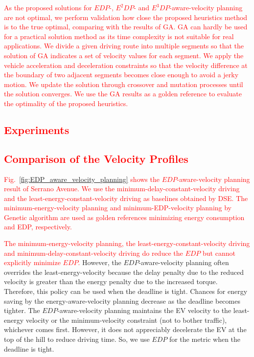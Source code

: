 \documentclass{IEEEtran}
\begin{document}
\textcolor{red}{As the proposed solutions for  $EDP$-, $E^2DP$- and $E^3DP$-aware-velocity planning are not optimal, we perform  validation how close the proposed heuristics method is to the true optimal, comparing with the results of GA. GA can hardly be used for a practical solution method as its time complexity is not suitable for real applications. %
We divide a given driving route into multiple segments so that the solution of GA indicates a set of velocity values for each segment. %
We apply the vehicle acceleration and deceleration constraints so that the velocity difference at the boundary of two adjacent segments becomes close enough to avoid a jerky motion. We update the solution through crossover and mutation processes until the solution converges. We use the GA results as a golden reference to evaluate the optimality of the proposed heuristics.} 

\textcolor{red}{\section{Experiments}\label{sec:experiment}}


\textcolor{red}{\subsection{Comparison of the Velocity Profiles}}

\textcolor{red}{Fig.~\ref{fig:EDP_aware_velocity_planning} shows the $EDP$-aware-velocity planning result of Serrano Avenue. We use the minimum-delay-constant-velocity driving and the least-energy-constant-velocity driving as baselines obtained by DSE. The minimum-energy-velocity planning and minimum-EDP-velocity planning by Genetic algorithm are used as golden references minimizing energy consumption and EDP, respectively.}

\textcolor{red}{The minimum-energy-velocity planning, the least-energy-constant-velocity driving and minimum-delay-constant-velocity driving do reduce the $EDP$ but cannot explicitly minimize $EDP$.} However, the $EDP$-aware-velocity planning often overrides the least-energy-velocity because the delay penalty due to the reduced velocity is greater than the energy penalty due to the increased torque. Therefore, this policy can be used when the deadline is tight. Chances for energy saving by the energy-aware-velocity planning decrease as the deadline becomes tighter. 
%
The $EDP$-aware-velocity planning maintains the EV velocity to the least-energy velocity or the minimum-velocity constraint (not to bother traffic), whichever comes first. However, it does not appreciably decelerate the EV at the top of the hill to reduce driving time. So, we use $EDP$ for the metric when the deadline is tight. 
\end{document}
